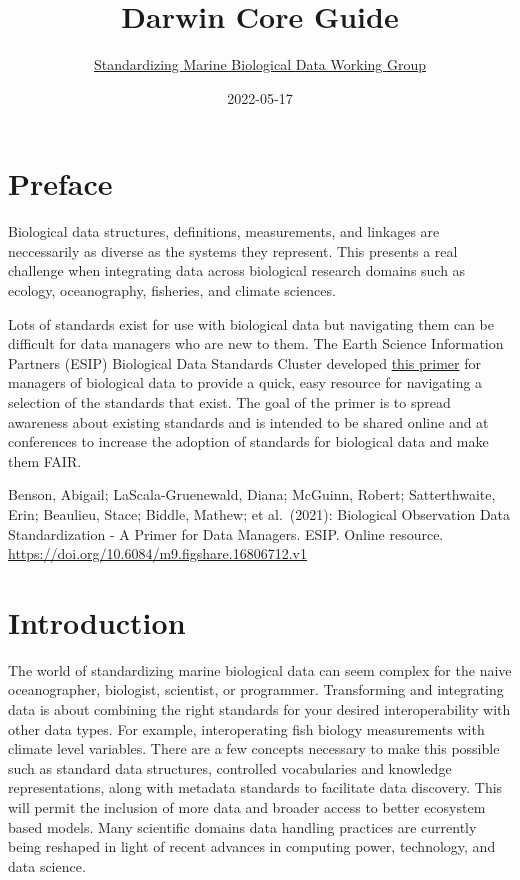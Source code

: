 \documentclass[
]{book}
\title{Darwin Core Guide}
\author{\href{https://github.com/ioos/bio_data_guide/graphs/contributors}{Standardizing Marine Biological Data Working Group}}
\date{2022-05-17}
\begin{document}
\maketitle

{
\setcounter{tocdepth}{1}
\tableofcontents
}
\hypertarget{preface}{%
\chapter*{Preface}\label{preface}}

Biological data structures, definitions, measurements, and linkages are neccessarily as diverse as the systems they represent. This presents a real challenge when integrating data across biological research domains such as ecology, oceanography, fisheries, and climate sciences.

Lots of standards exist for use with biological data but navigating them can be difficult for data managers who are new to them. The Earth Science Information Partners (ESIP) Biological Data Standards Cluster developed \href{https://doi.org/10.6084/m9.figshare.16806712.v1}{this primer} for managers of biological data to provide a quick, easy resource for navigating a selection of the standards that exist. The goal of the primer is to spread awareness about existing standards and is intended to be shared online and at conferences to increase the adoption of standards for biological data and make them FAIR.

Benson, Abigail; LaScala-Gruenewald, Diana; McGuinn, Robert; Satterthwaite, Erin; Beaulieu, Stace; Biddle, Mathew; et al.~(2021): Biological Observation Data Standardization - A Primer for Data Managers. ESIP. Online resource. \url{https://doi.org/10.6084/m9.figshare.16806712.v1}

\hypertarget{intro}{%
\chapter{Introduction}\label{intro}}

The world of standardizing marine biological data can seem complex for the naive oceanographer, biologist, scientist, or programmer.
Transforming and integrating data is about combining the right standards for your desired interoperability with other data types.
For example, interoperating fish biology measurements with climate level variables.
There are a few concepts necessary to make this possible such as standard data structures, controlled vocabularies and knowledge representations, along with metadata standards to facilitate data discovery. This will permit the inclusion of more data and broader access to better ecosystem based models. Many scientific domains data handling practices are currently being reshaped in light of recent advances in computing power, technology, and data science.
\end{document}
